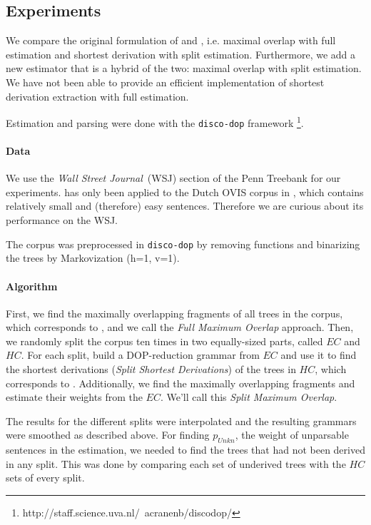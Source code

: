 \subsection{Experiments}

We compare the original formulation of \ddop{} and \dops{}, i.e. maximal overlap with full estimation and shortest derivation with split estimation. Furthermore, we add a new estimator that is a hybrid of the two: maximal overlap with split estimation. We have not been able to provide an efficient  implementation of shortest derivation extraction with full estimation.


Estimation and parsing were done with the {\tt disco-dop} framework \footnote{http://staff.science.uva.nl/~acranenb/discodop/}.


\paragraph{Data}
We use the \emph{Wall Street Journal}~(WSJ) section of the Penn Treebank for our experiments. \dops{} has only been applied to the Dutch OVIS corpus in \cite{zollmann2005}, which contains relatively small and (therefore) easy sentences. Therefore we are curious about its performance on the WSJ.

The corpus was preprocessed in {\tt disco-dop} by removing functions and binarizing the trees by Markovization (h=1, v=1). %

\paragraph{Algorithm}
First, we find the maximally overlapping fragments of all trees in the corpus, which corresponds to \ddop, and we call the \emph{Full Maximum Overlap} approach.
Then, we randomly split the corpus ten times in two equally-sized parts, called $EC$ and $HC$. For each split, build a DOP-reduction grammar from $EC$ and use it to find the shortest derivations (\emph{Split Shortest Derivations}) of the trees in $HC$, which corresponds to \dops{}. Additionally, we find the maximally overlapping fragments and estimate their weights from the $EC$. We'll call this \emph{Split Maximum Overlap}.

The results for the different splits were interpolated and the resulting grammars were smoothed as described above. For finding $p_{Unkn}$, the weight of unparsable sentences in the \dops{} estimation, we needed to find the trees that had not been derived in any split. This was done by comparing each set of underived trees with the $HC$ sets of every split.

